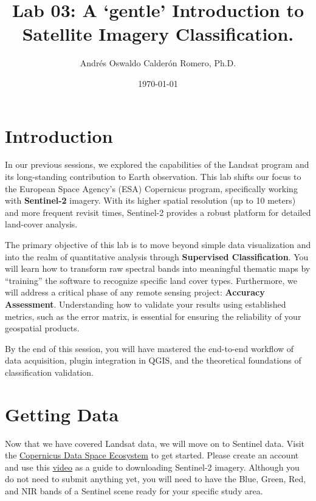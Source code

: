 \documentclass{article}
\title{Lab 03: A `gentle' Introduction to Satellite Imagery Classification.}
\author{Andrés Oswaldo Calderón Romero, Ph.D.}
\date{\today}
\begin{document}
\maketitle

\section{Introduction}
In our previous sessions, we explored the capabilities of the Landsat program and its long-standing contribution to Earth observation. This lab shifts our focus to the European Space Agency's (ESA) Copernicus program, specifically working with \textbf{Sentinel-2} imagery. With its higher spatial resolution (up to 10 meters) and more frequent revisit times, Sentinel-2 provides a robust platform for detailed land-cover analysis.

The primary objective of this lab is to move beyond simple data visualization and into the realm of quantitative analysis through \textbf{Supervised Classification}. You will learn how to transform raw spectral bands into meaningful thematic maps by ``training'' the software to recognize specific land cover types. Furthermore, we will address a critical phase of any remote sensing project: \textbf{Accuracy Assessment}. Understanding how to validate your results using established metrics, such as the error matrix, is essential for ensuring the reliability of your geospatial products.

By the end of this session, you will have mastered the end-to-end workflow of data acquisition, plugin integration in QGIS, and the theoretical foundations of classification validation.

\section{Getting Data}
Now that we have covered Landsat data, we will move on to Sentinel data. Visit the \href{https://dataspace.copernicus.eu/}{Copernicus Data Space Ecosystem} to get started. Please create an account and use this \href{https://youtu.be/htF8JD7QEfM}{video} as a guide to downloading Sentinel-2 imagery. Although you do not need to submit anything yet, you will need to have the Blue, Green, Red, and NIR bands of a Sentinel scene ready for your specific study area.
\end{document}
